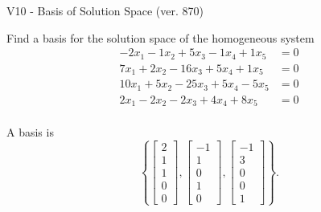 \begin{exercise}
  \begin{exerciseTitle}V10 - Basis of Solution Space (ver. 870)\end{exerciseTitle}
  \begin{exerciseStatement}
    Find a basis for the solution space of the homogeneous system 
\begin{align*}
 -2 x_ 1 -1 x_ 2 + 5 x_ 3 -1 x_ 4 + 1 x_ 5 &= 0  \\ 
  7 x_ 1 + 2 x_ 2 -16 x_ 3 + 5 x_ 4 + 1 x_ 5 &= 0  \\ 
  10 x_ 1 + 5 x_ 2 -25 x_ 3 + 5 x_ 4 -5 x_ 5 &= 0  \\ 
  2 x_ 1 -2 x_ 2 -2 x_ 3 + 4 x_ 4 + 8 x_ 5 &= 0  \\ 
 \end{align*}


 
  \end{exerciseStatement}

  \begin{exerciseAnswer}
   A basis is   
\[\left\{\left[\begin{array}{c}
2 \\
1 \\
1 \\
0 \\
0
\end{array}\right] , \left[\begin{array}{c}
-1 \\
1 \\
0 \\
1 \\
0
\end{array}\right] , \left[\begin{array}{c}
-1 \\
3 \\
0 \\
0 \\
1
\end{array}\right]\right\}.\]

  


  \end{exerciseAnswer}
\end{exercise}